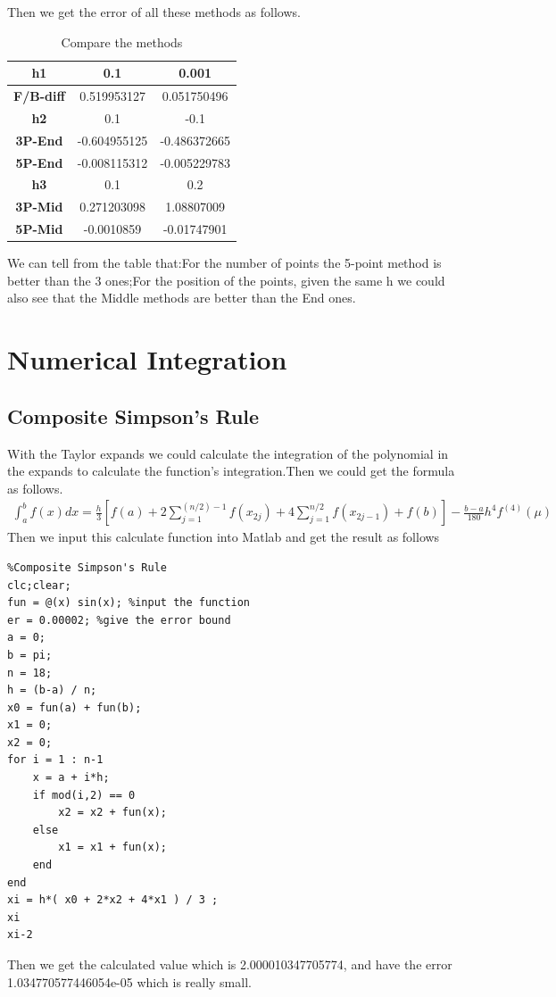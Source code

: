 \documentclass{article}
\begin{document}
Then we get the error of all these methods as follows.
\newpage
\begin{table}[!ht]
    \centering
    \begin{tabular}{|c|c|c|}
    \hline
        \textbf{h1} & 0.1 & 0.001 \\ \hline
        \textbf{F/B-diff} & 0.519953127 & 0.051750496 \\ \hline
        \textbf{h2} & 0.1 & -0.1 \\ \hline
        \textbf{3P-End} & -0.604955125 & -0.486372665 \\ \hline
        \textbf{5P-End} & -0.008115312 & -0.005229783 \\ \hline
        \textbf{h3} & 0.1 & 0.2 \\ \hline
        \textbf{3P-Mid} & 0.271203098 & 1.08807009 \\ \hline
        \textbf{5P-Mid} & -0.0010859 & -0.01747901 \\ \hline
    \end{tabular}
    \caption{Compare the methods}
    \label{compare}
\end{table}

We can tell from the table that:For the number of points the 5-point method is better than the 3 ones;For the position of the points, given the same h we could also see that the Middle methods are better than the End ones.

\section{Numerical Integration}
\subsection{Composite Simpson's Rule}
With the Taylor expands we could calculate the integration of the  polynomial in the expands to calculate the function's integration.Then we could get the formula as follows.
\begin{align}
    \int_{a}^{b} f(x) d x=\frac{h}{3}\left[f(a)+2 \sum_{j=1}^{(n / 2)-1} f\left(x_{2 j}\right)+4 \sum_{j=1}^{n / 2} f\left(x_{2 j-1}\right)+f(b)\right]-\frac{b-a}{180} h^{4} f^{(4)}(\mu)\nonumber
\end{align}
Then we input this calculate function into Matlab and get the result as follows
\begin{lstlisting}
%Composite Simpson's Rule
clc;clear;
fun = @(x) sin(x); %input the function
er = 0.00002; %give the error bound
a = 0;
b = pi;
n = 18;
h = (b-a) / n;
x0 = fun(a) + fun(b);
x1 = 0;
x2 = 0;
for i = 1 : n-1
    x = a + i*h;
    if mod(i,2) == 0
        x2 = x2 + fun(x);
    else
        x1 = x1 + fun(x);
    end
end
xi = h*( x0 + 2*x2 + 4*x1 ) / 3 ;
xi
xi-2
\end{lstlisting}
Then we get the calculated value which is 2.000010347705774, and have the error 1.034770577446054e-05 which is really small.
\end{document}

